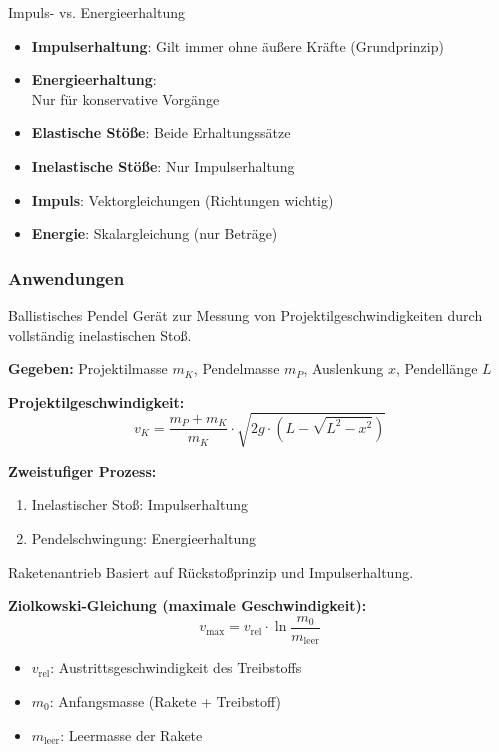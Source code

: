 \begin{concept}{Impuls- vs. Energieerhaltung}
    \begin{itemize}
        \item \textbf{Impulserhaltung}: Gilt immer ohne äußere Kräfte (Grundprinzip)
        \item \textbf{Energieerhaltung}: \\Nur für konservative Vorgänge
        \item \textbf{Elastische Stöße}: Beide Erhaltungssätze
        \item \textbf{Inelastische Stöße}: Nur Impulserhaltung
        \item \textbf{Impuls}: Vektorgleichungen (Richtungen wichtig)
        \item \textbf{Energie}: Skalargleichung (nur Beträge)
    \end{itemize}
\end{concept}

\multend

\subsubsection{Anwendungen}

\begin{example2}{Ballistisches Pendel}
    Gerät zur Messung von Projektilgeschwindigkeiten durch vollständig inelastischen Stoß.
    
    \textbf{Gegeben:} Projektilmasse $m_K$, Pendelmasse $m_P$, Auslenkung $x$, Pendellänge $L$
    
    \textbf{Projektilgeschwindigkeit:}
    $$
        v_K = \frac{m_P + m_K}{m_K} \cdot \sqrt{2g \cdot (L - \sqrt{L^2 - x^2})}
    $$
    
    \textbf{Zweistufiger Prozess:}
    \begin{enumerate}
        \item Inelastischer Stoß: Impulserhaltung
        \item Pendelschwingung: Energieerhaltung
    \end{enumerate}
\end{example2}

\begin{example2}{Raketenantrieb}
    Basiert auf Rückstoßprinzip und Impulserhaltung.
    
    \textbf{Ziolkowski-Gleichung (maximale Geschwindigkeit):}
    $$
        v_{\text{max}} = v_{\text{rel}} \cdot \ln\frac{m_0}{m_{\text{leer}}}
    $$
    
    \begin{itemize}
        \item $v_{\text{rel}}$: Austrittsgeschwindigkeit des Treibstoffs
        \item $m_0$: Anfangsmasse (Rakete + Treibstoff)
        \item $m_{\text{leer}}$: Leermasse der Rakete
    \end{itemize}
\end{example2}

